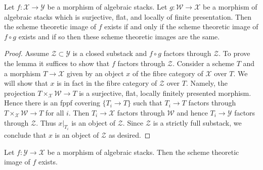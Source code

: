 \begin{lemma}
\label{lemma-cover-upstairs}
Let $f : \mathcal{X} \to \mathcal{Y}$ be a morphism of algebraic stacks.
Let $g : \mathcal{W} \to \mathcal{X}$ be a morphism of algebraic stacks
which is surjective, flat, and locally of finite presentation.
Then the scheme theoretic image of $f$ exists if and only if the
scheme theoretic image of $f \circ g$ exists and if so then these
scheme theoretic images are the same.
\end{lemma}

\begin{proof}
Assume $\mathcal{Z} \subset \mathcal{Y}$
is a closed substack and $f \circ g$ factors through $\mathcal{Z}$.
To prove the lemma it suffices to show
that $f$ factors through $\mathcal{Z}$.
Consider a scheme $T$ and a morphism $T \to \mathcal{X}$
given by an object $x$ of the fibre category of $\mathcal{X}$ over $T$.
We will show that $x$ is in fact in the fibre category of $\mathcal{Z}$
over $T$. Namely, the projection $T \times_\mathcal{X} \mathcal{W} \to T$
is a surjective, flat, locally finitely presented morphism.
Hence there is an fppf covering $\{T_i \to T\}$ such that
$T_i \to T$ factors through $T \times_\mathcal{X} \mathcal{W} \to T$
for all $i$. Then $T_i \to \mathcal{X}$ factors through $\mathcal{W}$
and hence $T_i \to \mathcal{Y}$ factors through $\mathcal{Z}$.
Thus $x|_{T_i}$ is an object of $\mathcal{Z}$.
Since $\mathcal{Z}$ is a strictly full substack, we conclude
that $x$ is an object of $\mathcal{Z}$ as desired.
\end{proof}

\begin{lemma}
\label{lemma-scheme-theoretic-image-existence}
Let $f : \mathcal{Y} \to \mathcal{X}$ be a morphism of algebraic stacks.
Then the scheme theoretic image of $f$ exists.
\end{lemma}

